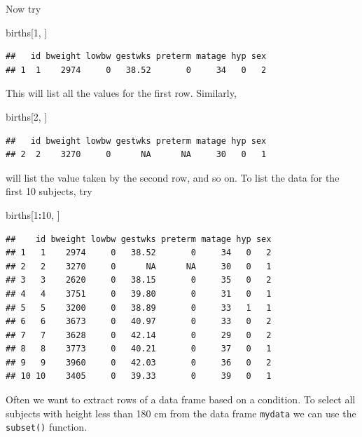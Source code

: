 \documentclass[
]{book}
\newenvironment{Shaded}{\begin{snugshade}}{\end{snugshade}}
\newcommand{\DecValTok}[1]{\textcolor[rgb]{0.00,0.00,0.81}{#1}}
\newcommand{\NormalTok}[1]{#1}
\newcommand{\SpecialCharTok}[1]{\textcolor[rgb]{0.81,0.36,0.00}{\textbf{#1}}}
\theoremstyle{definition}
\theoremstyle{definition}
\theoremstyle{definition}
\theoremstyle{definition}
\theoremstyle{remark}
\begin{document}
Now try

\begin{Shaded}
\begin{Highlighting}[]
\NormalTok{births[}\DecValTok{1}\NormalTok{, ]}
\end{Highlighting}
\end{Shaded}

\begin{verbatim}
##   id bweight lowbw gestwks preterm matage hyp sex
## 1  1    2974     0   38.52       0     34   0   2
\end{verbatim}

This will list all the values for the first row. Similarly,

\begin{Shaded}
\begin{Highlighting}[]
\NormalTok{births[}\DecValTok{2}\NormalTok{, ]}
\end{Highlighting}
\end{Shaded}

\begin{verbatim}
##   id bweight lowbw gestwks preterm matage hyp sex
## 2  2    3270     0      NA      NA     30   0   1
\end{verbatim}

will list the value taken by the second row, and so on.
To list the data for the first 10 subjects, try

\begin{Shaded}
\begin{Highlighting}[]
\NormalTok{births[}\DecValTok{1}\SpecialCharTok{:}\DecValTok{10}\NormalTok{, ]}
\end{Highlighting}
\end{Shaded}

\begin{verbatim}
##    id bweight lowbw gestwks preterm matage hyp sex
## 1   1    2974     0   38.52       0     34   0   2
## 2   2    3270     0      NA      NA     30   0   1
## 3   3    2620     0   38.15       0     35   0   2
## 4   4    3751     0   39.80       0     31   0   1
## 5   5    3200     0   38.89       0     33   1   1
## 6   6    3673     0   40.97       0     33   0   2
## 7   7    3628     0   42.14       0     29   0   2
## 8   8    3773     0   40.21       0     37   0   1
## 9   9    3960     0   42.03       0     36   0   2
## 10 10    3405     0   39.33       0     39   0   1
\end{verbatim}

Often we want to extract rows of a data frame based on a condition.
To select all subjects with height less than 180 cm from the
data frame \texttt{mydata} we can use the \texttt{subset()} function.
\end{document}
